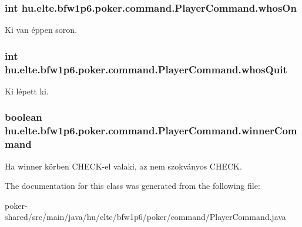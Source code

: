 \subsubsection[{whos\+On}]{\setlength{\rightskip}{0pt plus 5cm}int hu.\+elte.\+bfw1p6.\+poker.\+command.\+Player\+Command.\+whos\+On\hspace{0.3cm}{\ttfamily [protected]}}\label{classhu_1_1elte_1_1bfw1p6_1_1poker_1_1command_1_1_player_command_a4ce9722b75511026a274d944012d8a0a}
Ki van éppen soron. \hypertarget{classhu_1_1elte_1_1bfw1p6_1_1poker_1_1command_1_1_player_command_a43819862610cf28b8d411d99b3ae2810}{}
\subsubsection[{whos\+Quit}]{\setlength{\rightskip}{0pt plus 5cm}int hu.\+elte.\+bfw1p6.\+poker.\+command.\+Player\+Command.\+whos\+Quit\hspace{0.3cm}{\ttfamily [protected]}}\label{classhu_1_1elte_1_1bfw1p6_1_1poker_1_1command_1_1_player_command_a43819862610cf28b8d411d99b3ae2810}
Ki lépett ki. \hypertarget{classhu_1_1elte_1_1bfw1p6_1_1poker_1_1command_1_1_player_command_ab3043640310f87b9e7325a9e60b06c9a}{}
\subsubsection[{winner\+Command}]{\setlength{\rightskip}{0pt plus 5cm}boolean hu.\+elte.\+bfw1p6.\+poker.\+command.\+Player\+Command.\+winner\+Command\hspace{0.3cm}{\ttfamily [protected]}}\label{classhu_1_1elte_1_1bfw1p6_1_1poker_1_1command_1_1_player_command_ab3043640310f87b9e7325a9e60b06c9a}
Ha winner körben C\+H\+E\+C\+K-\/el valaki, az nem szokványos C\+H\+E\+C\+K. 

The documentation for this class was generated from the following file\+:\begin{DoxyCompactItemize}
\item 
poker-\/shared/src/main/java/hu/elte/bfw1p6/poker/command/Player\+Command.\+java\end{DoxyCompactItemize}
